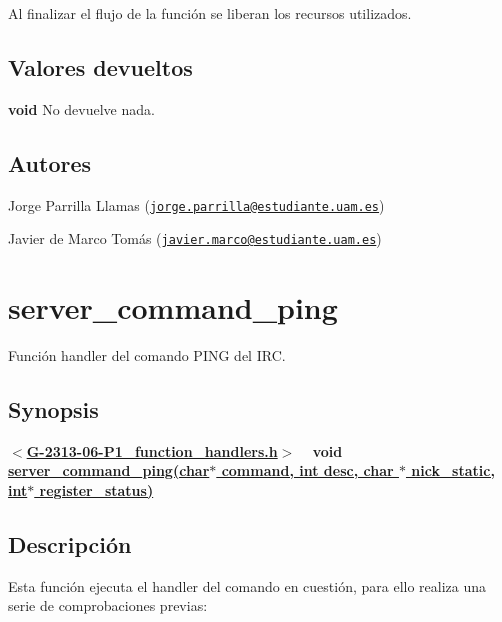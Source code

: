 Al finalizar el flujo de la función se liberan los recursos utilizados.\hypertarget{server_command_quit_return_quit}{}\subsection{Valores devueltos}\label{server_command_quit_return_quit}

\begin{DoxyItemize}
\item {\bfseries void} No devuelve nada. 
\end{DoxyItemize}\hypertarget{server_command_quit_authors_quit}{}\subsection{Autores}\label{server_command_quit_authors_quit}

\begin{DoxyItemize}
\item Jorge Parrilla Llamas (\href{mailto:jorge.parrilla@estudiante.uam.es}{\tt jorge.\+parrilla@estudiante.\+uam.\+es}) 
\item Javier de Marco Tomás (\href{mailto:javier.marco@estudiante.uam.es}{\tt javier.\+marco@estudiante.\+uam.\+es}) 
\end{DoxyItemize}\hypertarget{server_command_ping}{}\section{server\+\_\+command\+\_\+ping}\label{server_command_ping}
Función handler del comando P\+I\+NG del I\+RC.\hypertarget{server_command_ping_synopsis_ping}{}\subsection{Synopsis}\label{server_command_ping_synopsis_ping}
{ {\bfseries $<$\hyperlink{G-2313-06-P1__function__handlers_8h}{G-\/2313-\/06-\/\+P1\+\_\+function\+\_\+handlers.\+h}$>$} ~\newline
 {\bfseries void \hyperlink{G-2313-06-P1__function__handlers_8c_acc1c181bf44087b9216d1b59809937aa}{server\+\_\+command\+\_\+ping(char$\ast$ command, int desc, char $\ast$ nick\+\_\+static, int$\ast$ register\+\_\+status)}} } \hypertarget{server_command_ping_descripcion_ping}{}\subsection{Descripción}\label{server_command_ping_descripcion_ping}
Esta función ejecuta el handler del comando en cuestión, para ello realiza una serie de comprobaciones previas\+:


